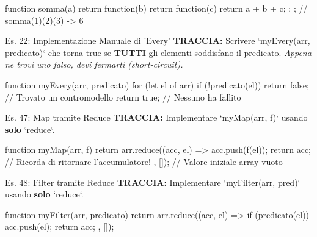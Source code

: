 \begin{jsbox}
function somma(a) {
    return function(b) {
        return function(c) {
            return a + b + c;
        };
    };
}
// somma(1)(2)(3) -> 6
\end{jsbox}

\begin{esercizio}{Es. 22: Implementazione Manuale di 'Every'}
\textbf{TRACCIA:} Scrivere `myEvery(arr, predicato)` che torna true se \textbf{TUTTI} gli elementi soddisfano il predicato.
\textit{Appena ne trovi uno falso, devi fermarti (short-circuit).}
\end{esercizio}

\begin{jsbox}
function myEvery(arr, predicato) {
    for (let el of arr) {
        if (!predicato(el)) {
            return false; // Trovato un contromodello
        }
    }
    return true; // Nessuno ha fallito
}
\end{jsbox}

\begin{esercizio}{Es. 47: Map tramite Reduce}
\textbf{TRACCIA:} Implementare `myMap(arr, f)` usando \textbf{solo} `reduce`.
\end{esercizio}

\begin{jsbox}
function myMap(arr, f) {
    return arr.reduce((acc, el) => {
        acc.push(f(el));
        return acc; // Ricorda di ritornare l'accumulatore!
    }, []); // Valore iniziale array vuoto
}
\end{jsbox}

\begin{esercizio}{Es. 48: Filter tramite Reduce}
\textbf{TRACCIA:} Implementare `myFilter(arr, pred)` usando \textbf{solo} `reduce`.
\end{esercizio}

\begin{jsbox}
function myFilter(arr, predicato) {
    return arr.reduce((acc, el) => {
        if (predicato(el)) {
            acc.push(el);
        }
        return acc;
    }, []);
}
\end{jsbox}
